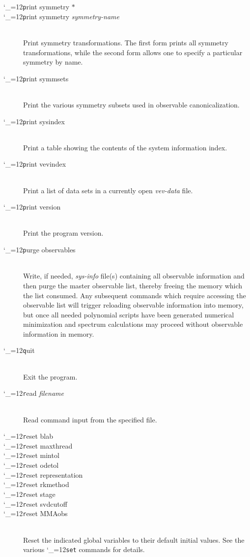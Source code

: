 \documentclass [12pt]{article}
\makeatletter
\renewcommand{\tt}{\begingroup\catcode`_=12\def\_{\string_}\tt@}
\newcommand{\tt@}[1]{\texttt{#1}\endgroup}
\makeatother
\begin{document}
\begin{description}
\item [\tt print symmetry $*$] \bgroup \itemsep 0pt \parskip 0pt
\item [\tt print symmetry {\it symmetry-name}]~\\
    Print symmetry transformations.
    The first form prints all symmetry transformations,
    while the second form allows one to specify a particular symmetry
    by name.
\egroup

\item [\tt print symmsets]~\\
    Print the various symmetry subsets used in observable canonicalization.

\item [\tt print sysindex]~\\
    Print a table showing the contents of the system information index.

\item [\tt print vevindex]~\\
    Print a list of data sets in a currently open \textit{vev-data} file.

\item [\tt print version]~\\
    Print the program version.

\item [\tt purge observables]~\\
    Write, if needed, \textit{sys-info} file(s) containing all observable information
    and then purge the master observable list, thereby freeing the memory
    which the list consumed.
    Any subsequent commands which require accessing the observable list will
    trigger reloading observable information into memory,
    but once all needed polynomial scripts have been generated
    numerical minimization and spectrum calculations may proceed
    without observable information in memory.

\item [\tt quit]~\\
    Exit the program.

\item [\tt read {\it filename}]~\\
    Read command input from the specified file.

\item [\tt reset blab]\bgroup \itemsep 0pt \parskip 0pt
\item [\tt reset maxthread]
\item [\tt reset mintol]
\item [\tt reset odetol]
\item [\tt reset representation]
\item [\tt reset rkmethod]
\item [\tt reset stage]
\item [\tt reset svdcutoff]
\item [\tt reset MMAobs]~\\
    Reset the indicated global variables to their default initial values.
    See the various \tt{set} commands for details.
\egroup


\end{description}
\end{document}
